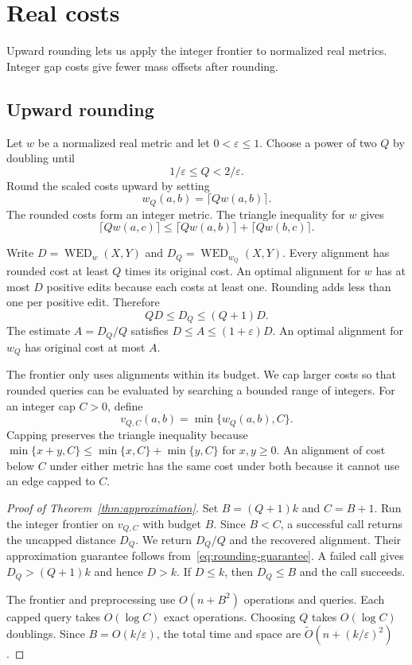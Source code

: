 \documentclass[11pt]{article}
\theoremstyle{remark}
\newcommand{\WED}{\operatorname{WED}}
\newcommand{\eps}{\varepsilon}
\newcommand{\softO}{\widetilde O}
\begin{document}
\section{Real costs}\label{sec:approximation}\label{sec:extensions}

Upward rounding lets us apply the integer frontier to normalized real
metrics. Integer gap costs give fewer mass offsets after rounding.

\subsection{Upward rounding}

Let $w$ be a normalized real metric and let $0<\eps\le1$.
Choose a power of two $Q$ by doubling until
\begin{equation}\label{eq:Q}
 1/\eps\le Q<2/\eps.
\end{equation}
Round the scaled costs upward by setting
\begin{equation}\label{eq:rounding}
 w_Q(a,b)=\lceil Qw(a,b)\rceil.
\end{equation}
The rounded costs form an integer metric. The triangle inequality for
$w$ gives
\[
 \lceil Qw(a,c)\rceil
 \le \lceil Qw(a,b)\rceil+\lceil Qw(b,c)\rceil.
\]

Write $D=\WED_w(X,Y)$ and $D_Q=\WED_{w_Q}(X,Y)$.
Every alignment has rounded cost at least $Q$ times its original cost.
An optimal alignment for $w$ has at most $D$ positive edits because
each costs at least one. Rounding adds less than one per positive edit.
Therefore
\begin{equation}\label{eq:rounding-guarantee}
 QD\le D_Q\le(Q+1)D.
\end{equation}
The estimate $A=D_Q/Q$ satisfies $D\le A\le(1+\eps)D$.
An optimal alignment for $w_Q$ has original cost at most $A$.

The frontier only uses alignments within its budget.
We cap larger costs so that rounded queries can be evaluated by
searching a bounded range of integers.
For an integer cap $C>0$, define
\[
 v_{Q,C}(a,b)=\min\{w_Q(a,b),C\}.
\]
Capping preserves the triangle inequality because
$\min\{x+y,C\}\le\min\{x,C\}+\min\{y,C\}$ for $x,y\ge0$.
An alignment of cost below $C$ under either metric has the same cost
under both because it cannot use an edge capped to $C$.

\begin{proof}[Proof of Theorem~\ref{thm:approximation}]
Set $B=(Q+1)k$ and $C=B+1$. Run the integer frontier on $v_{Q,C}$
with budget $B$. Since $B<C$, a successful call returns the uncapped
distance $D_Q$. We return $D_Q/Q$ and the recovered alignment.
Their approximation guarantee follows
from~\eqref{eq:rounding-guarantee}. A failed call gives $D_Q>(Q+1)k$
and hence $D>k$. If $D\le k$, then $D_Q\le B$ and the call succeeds.

The frontier and preprocessing use $O(n+B^2)$ operations and queries.
Each capped query takes $O(\log C)$ exact operations.
Choosing $Q$ takes $O(\log C)$ doublings.
Since $B=O(k/\eps)$, the total time and space are
$\softO(n+(k/\eps)^2)$.
\end{proof}
\end{document}
